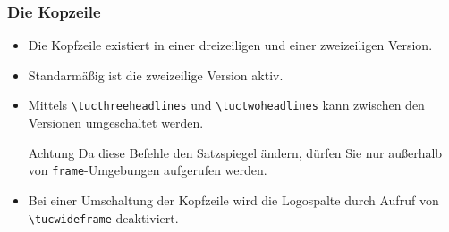 \begin{frame}[containsverbatim]
\frametitle{Die Kopzeile}

\begin{itemize}
\item Die Kopfzeile existiert in einer dreizeiligen und einer zweizeiligen Version.
\item Standarmäßig ist die zweizeilige Version aktiv.
\item Mittels \lstinline[language={[LaTeX]TeX}]+\tucthreeheadlines+ und
      \lstinline[language={[LaTeX]TeX}]+\tuctwoheadlines+ kann zwischen den Versionen
      umgeschaltet werden.

\medskip
\begin{alertblock}{Achtung}
\centering
Da diese Befehle den Satzspiegel ändern, dürfen Sie nur außerhalb von
\texttt{frame}-Umgebungen aufgerufen werden.
\end{alertblock}
\medskip

\item Bei einer Umschaltung der Kopfzeile wird  die Logospalte
      durch Aufruf von \lstinline[language={[LaTeX]TeX}]+\tucwideframe+ deaktiviert.
\end{itemize}
\end{frame}


\begingroup
{}


